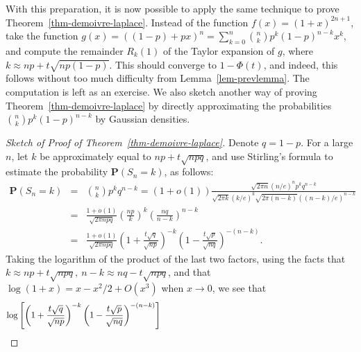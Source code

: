 \documentclass[12pt]{article}
\newcommand{\prob}{\mathbf{P}}
\theoremstyle{example}
\begin{document}
With this preparation, it is now possible to apply the same technique to prove Theorem~\ref{thm-demoivre-laplace}. Instead of the function $f(x)=(1+x)^{2n+1}$, take the function $g(x)=((1-p) + p x)^n=\sum_{k=0}^n \binom{n}{k} p^k (1-p)^{n-k} x^k$, and compute the remainder $R_k(1)$ of the Taylor expansion of $g$, where $k \approx np + t \sqrt{np(1-p)}$. This should converge to $1-\Phi(t)$, and indeed, this follows without too much difficulty from Lemma~\ref{lem-prevlemma}. The computation is left as an exercise. We also sketch another way of proving Theorem~\ref{thm-demoivre-laplace} by directly approximating the probabilities $\binom{n}{k} p^k (1-p)^{n-k}$ by Gaussian densities.

\begin{proof}[Sketch of Proof of Theorem~\ref{thm-demoivre-laplace}]
Denote $q=1-p$. For a large $n$, let $k$ be approximately equal to $np+t\sqrt{npq}$, and use Stirling's formula to estimate the probability $\prob(S_n=k)$, as follows:
\begin{eqnarray*}
\prob(S_n = k) &=& \binom{n}{k} p^k q^{n-k} = (1+o(1)) \frac{\sqrt{2\pi n} (n/e)^n p^k q^{n-k}}{ \sqrt{2\pi k} (k/e)^k \sqrt{2\pi (n-k)} ((n-k)/e)^{n-k}}
\\ &=&  \frac{1+o(1)}{\sqrt{2\pi n p q}} \left(\frac{np}{k}\right)^k \left( \frac{nq}{n-k}\right)^{n-k} 
\\ &=& \frac{1+o(1)}{\sqrt{2\pi n p q}} \left(1+\frac{t\sqrt{q}}{\sqrt{np}}\right)^{-k} \left(1- \frac{t\sqrt{p}}{\sqrt{nq}}\right)^{-(n-k)}. 
\end{eqnarray*}
Taking the logarithm of the product of the last two factors, using the facts that $k\approx np+t\sqrt{npq},\ n-k\approx nq-t\sqrt{npq}$, and that $\log(1+x)=x-x^2/2+O(x^3)$ when $x\to0$, we see that
$$
\log\left[\left(1+\frac{t\sqrt{q}}{\sqrt{np}}\right)^{-k} \left(1- \frac{t\sqrt{p}}{\sqrt{nq}}\right)^{-(n-k)}\right]
\hspace{220.0pt}
$$


\end{proof}
\end{document}
